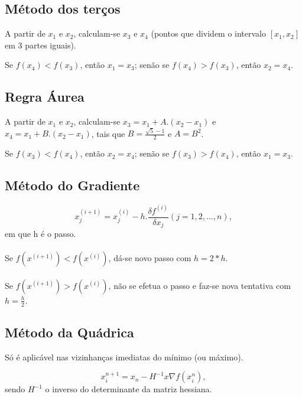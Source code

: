 \documentclass[../resumosMNUM.tex]{subfiles}
\begin{document}
 

\subsection{Método dos terços}

A partir de $x_1$ e $x_2$, calculam-se $x_3$ e $x_4$ (pontos que dividem o intervalo $[x_1, x_2]$ em 3 partes iguais).

Se $f(x_4) < f(x_3)$, então $x_1 = x_3$; senão se $f(x_4) > f(x_3)$, então $x_2 = x_4$.

\subsection{Regra Áurea}

A partir de $x_1$ e $x_2$, calculam-se $x_3 = x_1 + A.(x_2 - x_1)$ e $x_4 = x_1 + B.(x_2 - x_1)$, tais que $B = \frac{\sqrt{5} - 1}{2}$ e $A = B^2$.

Se $f(x_3) < f(x_4)$, então $x_2 = x_4$; senão se $f(x_3) > f(x_4)$, então $x_1 = x_3$.

\subsection{Método do Gradiente}

\[x_j^{(i+1)} = x_j^{(i)} - h.\frac{\delta f^{(i)}}{\delta x_j} (j=1,2,...,n), \] em que h é o passo.

\paragraph{}

Se $f(x^{(i+1)}) < f(x^{(i)})$, dá-se novo passo com $h = 2*h$.

\paragraph{}

Se $f(x^{(i+1)}) > f(x^{(i)})$, não se efetua o passo e faz-se nova tentativa com $h = \frac{h}{2}$.

\subsection{Método da Quádrica}

Só é aplicável nas vizinhanças imediatas do mínimo (ou máximo).

\[x_i^{n+1} = x_n - H^{-1}x\nabla f(x_i^n), \]
sendo $H^{-1}$ o inverso do determinante da matriz hessiana.
\end{document}
